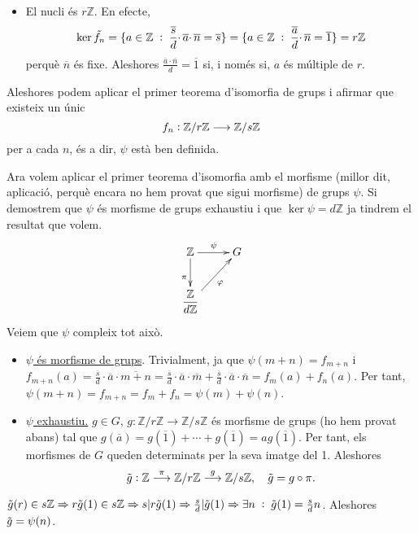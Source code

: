 \documentclass[../main.tex]{subfiles}
\begin{document}
\begin{sol}
\begin{enumerate}[(a)]
\begin{itemize}
        \item El nucli és $r\mathbb{Z}$. En efecte,
        \begin{equation}
            \notag\ker\Tilde{f_n} = \{a\in\mathbb{Z}\;:\;\frac{\overline{s}}{d}\cdotp\overline{a}\cdotp\overline{n} = \overline{s}\} = \{a\in\mathbb{Z}\;:\;\frac{\overline{a}}{d}\cdotp\overline{n} = \overline{1}\} = r\mathbb{Z}
        \end{equation}
        perquè $\overline{n}$ és fixe. Aleshores $\frac{\overline{a}\cdotp\overline{n}}{d} = \overline{1}$ si, i només si, $a$ és múltiple de $r$.
    \end{itemize}
    Aleshores podem aplicar el primer teorema d'isomorfia de grups i afirmar que existeix un únic 
    \begin{equation}
        \notag
        f_n:\mathbb{Z}/r\mathbb{Z}\longrightarrow \mathbb{Z}/s\mathbb{Z}
    \end{equation}
    per a cada $n$, és a dir, $\psi$ està ben definida.
    
    Ara volem aplicar el primer teorema d'isomorfia amb el morfisme (millor dit, aplicació, perquè encara no hem provat que sigui morfisme) de grups $\psi$. Si demostrem que $\psi$ és morfisme de grups exhaustiu i que $\ker\psi =d\mathbb{Z}$ ja tindrem el resultat que volem.
    \begin{equation}
        \notag
        \xymatrix{
        \mathbb{Z} \ar[d]_{\pi} \ar[r]^\psi & G \\
        \dfrac{\mathbb{Z}}{d\mathbb{Z}} \ar[ru]_{\varphi}
        }
    \end{equation}
    Veiem que $\psi$ compleix tot això.
    \begin{itemize}
        \item \underline{$\psi$ és morfisme de grups}. Trivialment, ja que $\psi(m+n) = f_{m+n}$ i $f_{m+n}(a) = \frac{\overline{s}}{d}\cdotp\overline{a}\cdotp\overline{m+n} = \frac{\overline{s}}{d}\cdotp\overline{a}\cdotp\overline{m}+\frac{\overline{s}}{d}\cdotp\overline{a}\cdotp\overline{n} =f_m(a)+f_n(a)$. Per tant, $\psi(m+n) = f_{m+n} = f_m+f_n = \psi(m)+\psi(n)$.
        
        \item \underline{$\psi$ exhaustiu.} $g\in G$, $g:\mathbb{Z}/r\mathbb{Z}\longrightarrow \mathbb{Z}/s\mathbb{Z}$ és morfisme de grups (ho hem provat abans) tal que $g(\overline{a}) = g(\overline{1})+\cdots+g(\overline{1}) = ag(\overline{1})$. Per tant, els morfismes de $G$ queden determinats per la seva imatge del 1. Aleshores
        \begin{equation}
            \notag
            \Tilde{g}:\mathbb{Z}\overset{\pi}{\longrightarrow}\mathbb{Z}/r\mathbb{Z}\overset{g}{\longrightarrow}\mathbb{Z}/s\mathbb{Z},\quad \Tilde{g} = g\circ\pi.
        \end{equation}
    \end{itemize}
    $\Tilde{g}(r)\in s\mathbb{Z}\Rightarrow r\Tilde{g}(1)\in s\mathbb{Z}\Rightarrow s|r\Tilde{g}(1)\Rightarrow\frac{s}{d}|\Tilde{g}(1)\Rightarrow \exists n\;:\;\Tilde{g}(1) = \frac{s}{d}n$. Aleshores $\Tilde{g} = \psi(n)$.
    

\end{enumerate}
\end{sol}
\end{document}

